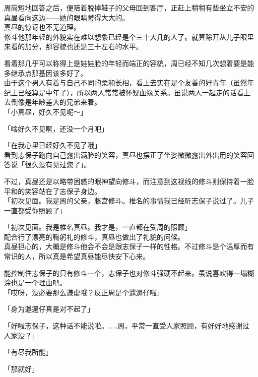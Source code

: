 周简短地回答之后，便陪着脱掉鞋子的父母回到客厅，正赶上稍稍有些坐立不安的真昼看向这边——她的眼睛瞪得大大的。\\

真昼的惊讶也不无道理。\\

修斗他那年轻的外貌实在难以想象已经是个三十大几的人了。就算除开从儿子眼里来看的加分，那容貌也还是三十左右的水平。

看着那几乎可以称得上是娃娃脸的年轻而端正的容貌，周已经不知几次想着要是能多继承点那基因该多好了。\\

由于这个男人有着与自己不同的柔和长相，看上去实在是个友善的好青年（虽然年纪上已经算是中年了），所以两人常常被怀疑血缘关系。虽说两人一起走的话看上去倒像是年龄差大的兄弟来着。\\

「小真昼，好久不见呢～」

「啥好久不见啊，还没一个月吧」

「在我心里已经好久不见了哦」\\

看到志保子跑向自己露出满脸的笑容，真昼也摆正了坐姿微微露出外出用的笑容回答说「很久没有见过您了」。

不过，真昼还是以略带困惑的眼神望向修斗，而注意到这视线的修斗则保持着一脸平和的笑容站在了志保子身边。\\

「初次见面。我是周的父亲，藤宫修斗。椎名的事情我已经听志保子说过了。儿子一直都受你照顾了」

「初次见面。我是椎名真昼。我才是，一直都在受周的照顾」\\

配合行了漂亮的鞠躬礼的修斗，真昼也做出了礼貌的问候。\\

真昼担心的，大概是修斗他会不会是跟志保子一样的性格。不过修斗是个温厚而有常识的人，所以真是希望真昼能尽快安下心来。

能控制住志保子的只有修斗一个，志保子也对修斗强硬不起来。虽说喜欢得一塌糊涂也是一个理由吧。\\

「哎呀，没必要那么谦虚哦？反正周是个邋遢仔啦」

「身为邋遢仔真是对不起了」

「好啦志保子，这种话不能说啦。……周，平常一直受人家照顾，有好好地感谢过人家没？」

「有尽我所能」

「那就好」\\

